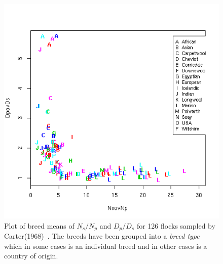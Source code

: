 %

\begin{figure}[!h]
  \centering
   \includegraphics[width=1.0\textwidth]{NsovNpDpovDs.png}
  \caption{Plot of breed means of $N_{s}/N_{p}$ and $D_{p}/D_{s}$ for 126 flocks sampled by Carter(1968)~\cite{cart:68}. The breeds have been grouped into a {\em breed type} which in some cases is an individual breed and in other cases is a country of origin. }
  \label{fig:NsovNpDpovDs}
\end{figure}

%

